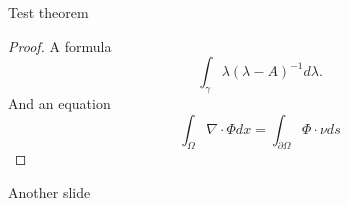 \begin{frame}

\begin{theorem}
  Test theorem
\end{theorem}
\begin{proof}
  A formula
  $$
  \int_\gamma \lambda (\lambda - A)^{-1} d\lambda.
  $$
  And an equation
  \begin{equation}
    \int_\Omega \nabla \cdot \Phi d x = \int_{\partial \Omega} \Phi \cdot \nu d s
  \end{equation}
\end{proof}
\end{frame}
\begin{frame}
Another slide
\end{frame}
